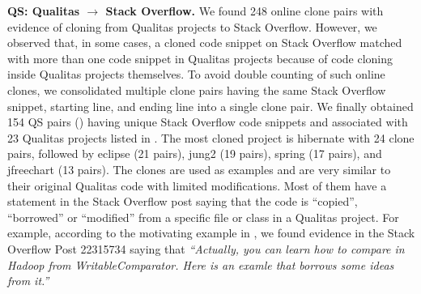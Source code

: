 \documentclass[10pt,journal,compsoc]{IEEEtran}
\begin{document}
\textbf{QS: Qualitas $\rightarrow$ Stack Overflow.} We found 248 online clone
pairs with evidence of cloning from Qualitas projects to Stack Overflow.
However, we observed that, in some cases, a cloned code snippet on Stack
Overflow matched with more than one code snippet in Qualitas projects because of
code cloning inside Qualitas projects themselves. To avoid double counting of
such online clones, we consolidated multiple clone pairs having the same Stack
Overflow snippet, starting line, and ending line into a single clone pair. We
finally obtained 154 QS pairs () having unique Stack Overflow code snippets and
associated with 23 Qualitas projects listed in .
The most cloned project is \textsf{hibernate} with 24
clone pairs, followed by \textsf{eclipse} (21 pairs), \textsf{jung2} (19 pairs),
\textsf{spring} (17 pairs), and \textsf{jfreechart} (13 pairs). The clones are
used as examples and are very similar to their original Qualitas code with
limited modifications. Most of them have a statement in the Stack Overflow post
saying that the code is ``copied'', ``borrowed'' or ``modified'' from a specific
file or class in a Qualitas project. For example, according to the motivating
example in , we found evidence in the Stack Overflow Post
22315734 saying that \textit{``Actually, you can learn how to compare in Hadoop
from WritableComparator. Here is an examle that borrows some ideas from it.''}
\end{document}
